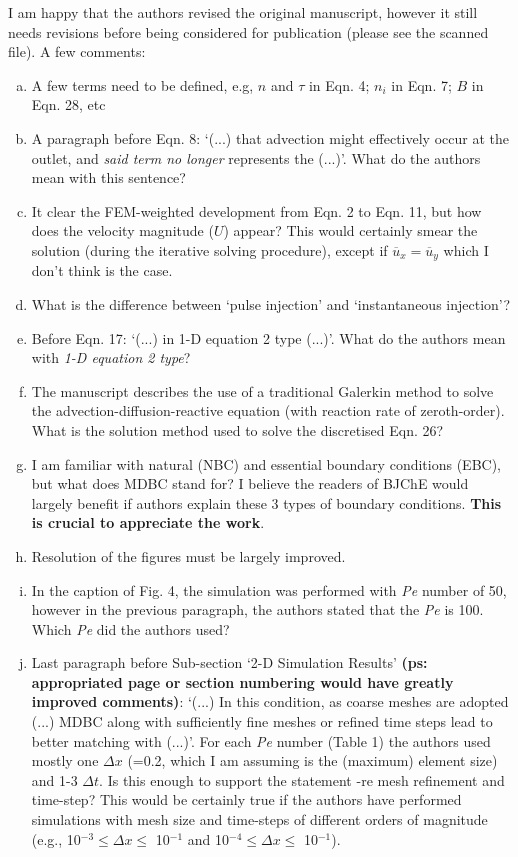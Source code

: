 \documentclass[14pt,twoside]{report}
\begin{document}
I am happy that the authors revised the original manuscript, however it still needs revisions before being considered for publication (please see the scanned file). A few comments:
%
\begin{enumerate}[(a)] 
%
\item A few terms need to be defined, e.g, $n$ and $\tau$ in Eqn. 4; $n_{i}$ in Eqn. 7; $B$ in Eqn. 28,  etc
%
\item A paragraph before Eqn. 8: `(...) that advection might effectively occur at the outlet, and {\it said term no longer} represents the (...)'. What do the authors mean with this sentence?
%
\item It clear the FEM-weighted development from Eqn. 2 to Eqn. 11, but how does the velocity magnitude ($U$) appear? This would certainly smear the solution (during the iterative solving procedure), except if $\overline{u}_{x}=\overline{u}_{y}$ which I don't think is the case.
%
\item What is the difference between `pulse injection' and `instantaneous injection'?
%
\item Before Eqn. 17: `(...) in 1-D equation 2 type (...)'. What do the authors mean with {\it 1-D equation 2 type}?
%
\item The manuscript describes the use of a traditional Galerkin method to solve the advection-diffusion-reactive equation (with reaction rate of zeroth-order). What is the solution method used to solve the discretised Eqn. 26?
%
\item I am familiar with natural (NBC) and essential boundary conditions (EBC), but what does MDBC stand for? I believe the readers of BJChE would largely benefit if authors explain these 3 types of boundary conditions. {\bf This is crucial to appreciate the work}.
%
\item Resolution of the figures must be largely improved.
%
\item In the caption of Fig. 4, the simulation was performed with {\it Pe} number of 50, however in the previous paragraph, the authors stated that the {\it Pe} is 100. Which {\it Pe} did the authors used? 
%
\item Last paragraph before Sub-section `2-D Simulation Results' {\bf (ps: appropriated page or section numbering would have greatly improved comments)}: `(...) In this condition, as coarse meshes are adopted (...) MDBC along with sufficiently fine meshes or refined time steps lead to better matching with (...)'. For each {\it Pe} number (Table 1) the authors used mostly one $\Delta x$ (=0.2, which I am assuming is the (maximum) element size) and 1-3 $\Delta t$. Is this enough to support the statement -re mesh refinement and time-step? This would be certainly true if the authors have performed simulations with mesh size and time-steps of different orders of magnitude (e.g., 10$^{-3}\leq\Delta x\leq$ 10$^{-1}$ and 10$^{-4}\leq\Delta x\leq$ 10$^{-1}$).

\end{enumerate}
\end{document}
